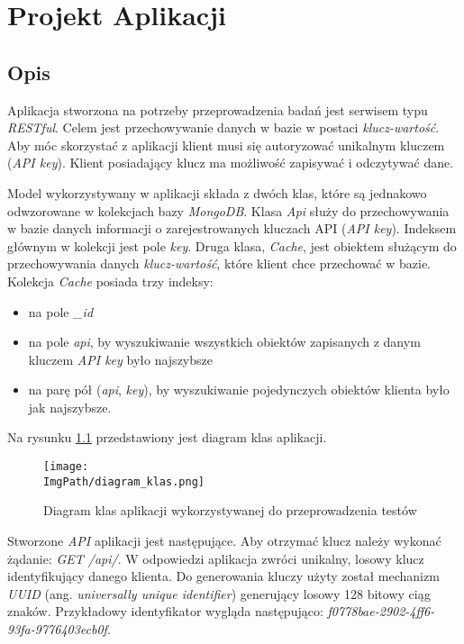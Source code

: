 \chapter{Projekt Aplikacji}
\section{Opis}
Aplikacja stworzona na potrzeby przeprowadzenia badań jest serwisem typu \textsl{RESTful}. Celem jest przechowywanie danych w bazie w postaci \textsl{klucz-wartość}. Aby móc skorzystać z aplikacji klient musi się autoryzować unikalnym kluczem (\textsl{API key}). Klient posiadający klucz ma możliwość zapisywać i odczytywać dane. 

Model wykorzystywany w aplikacji składa z dwóch klas, które są jednakowo odwzorowane w kolekcjach bazy \textsl{MongoDB}. Klasa \textsl{Api} służy do przechowywania w bazie danych informacji o zarejestrowanych kluczach API (\textsl{API key}). Indeksem głównym w kolekcji jest pole \textsl{key}.
Druga klasa, \textsl{Cache}, jest obiektem służącym do przechowywania danych \textsl{klucz-wartość}, które klient chce przechować w bazie. Kolekcja \textsl{Cache} posiada trzy indeksy:
\begin{itemize}
    \item na pole \textsl{\_id}
    \item na pole \textsl{api}, by wyszukiwanie wszystkich obiektów zapisanych z danym kluczem \textsl{API key} było najszybsze
    \item na parę pół (\textsl{api}, \textsl{key}), by wyszukiwanie pojedynczych obiektów klienta było jak najszybsze.
\end{itemize}
Na rysunku \ref{fig:class_diagram} przedstawiony jest diagram klas aplikacji. 
\begin{figure}[!ht]
\centering
\texttt{[image: \\ImgPath/diagram\_klas.png]}
\caption{Diagram klas aplikacji wykorzystywanej do przeprowadzenia testów}
\label{fig:class_diagram}
\end{figure}

Stworzone \textsl{API} aplikacji jest następujące. Aby otrzymać klucz należy wykonać żądanie: \textsl{GET /api/}. W odpowiedzi aplikacja zwróci unikalny, losowy klucz identyfikujący danego klienta. Do generowania kluczy użyty został mechanizm \textsl{UUID} (ang. \textsl{universally unique identifier}) generujący losowy 128 bitowy ciąg znaków. Przykładowy identyfikator wygląda następująco: \textsl{f0778bae-2902-4ff6-93fa-9776403ecb0f}.

